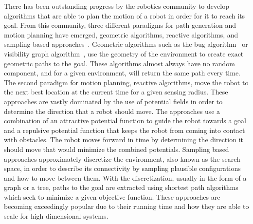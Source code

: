 \documentclass[letterpaper, 10pt, conference]{ieeeconf}
\begin{document}
There has been outstanding progress by the robotics community to develop
algorithms that are able to plan the motion of a robot in order for it to reach
its goal. From this community, three different paradigms for path generation
and motion planning have emerged, geometric algorithms, reactive algorithms,
and sampling based approaches~\cite{choset, lavalle}. Geometric algorithms such
as the bug algorithm~\cite{weir} or visibility graph algorithm~\cite{vis}, use
the geometry of the environment to create exact geometric paths to the goal.
These algorithms almost always have no random component, and for a given
environment, will return the same path every time. The second paradigm for
motion planning, reactive algorithms, move the robot to the next best location
at the current time for a given sensing radius. These approaches are vastly
dominated by the use of potential fields in order to determine the direction
that a robot should move. The approaches use a combination of an attractive
potential function to guide the robot towards a goal and a repulsive potential
function that keeps the robot from coming into contact with obstacles. The
robot moves forward in time by determining the direction it should move that
would minimize the combined potentials. Sampling based approaches approximately
discretize the environment, also known as the search space, in order to
describe its connectivity by sampling plausible configurations and how to move
between them.  With the discretization, usually in the form of a graph or a
tree, paths to the goal are extracted using shortest path algorithms which seek
to minimize a given objective function. These approaches are becoming
exceedingly popular due to their running time and how they are able to scale
for high dimensional systems.
\end{document}
